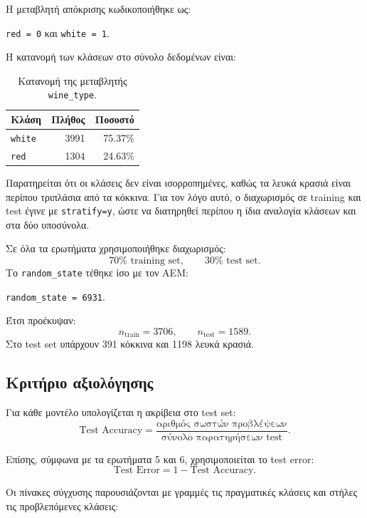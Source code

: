 \documentclass[12pt,a4paper]{article}
\newcommand{\code}[1]{\texttt{\textenglish{#1}}}
\begin{document}
Η μεταβλητή απόκρισης κωδικοποιήθηκε ως:
\begin{center}
    \code{red = 0} \hspace{1cm} και \hspace{1cm} \code{white = 1}.
\end{center}

Η κατανομή των κλάσεων στο σύνολο δεδομένων είναι:

\begin{table}[H]
\centering
\caption{Κατανομή της μεταβλητής \code{wine\_type}.}
\begin{tabular}{lrr}
\toprule
\textbf{Κλάση} & \textbf{Πλήθος} & \textbf{Ποσοστό} \\
\midrule
\code{white} & 3991 & 75.37\% \\
\code{red}   & 1304 & 24.63\% \\
\bottomrule
\end{tabular}
\end{table}

Παρατηρείται ότι οι κλάσεις δεν είναι ισορροπημένες, καθώς τα λευκά κρασιά
είναι περίπου τριπλάσια από τα κόκκινα. Για τον λόγο αυτό, ο διαχωρισμός σε
training και test έγινε με \code{stratify=y}, ώστε να διατηρηθεί περίπου η ίδια
αναλογία κλάσεων και στα δύο υποσύνολα.

Σε όλα τα ερωτήματα χρησιμοποιήθηκε διαχωρισμός:
\[
    70\% \text{ training set}, \qquad 30\% \text{ test set}.
\]
Το \code{random\_state} τέθηκε ίσο με τον ΑΕΜ:
\begin{center}
    \code{random\_state = 6931}.
\end{center}

Έτσι προέκυψαν:
\[
    n_{\text{train}}=3706, \qquad n_{\text{test}}=1589.
\]
Στο test set υπάρχουν 391 κόκκινα και 1198 λευκά κρασιά.

\subsection{Κριτήριο αξιολόγησης}

Για κάθε μοντέλο υπολογίζεται η ακρίβεια στο test set:
\[
    \text{Test Accuracy} =
    \frac{\text{αριθμός σωστών προβλέψεων}}{\text{σύνολο παρατηρήσεων test}}.
\]

Επίσης, σύμφωνα με τα ερωτήματα 5 και 6, χρησιμοποιείται το test error:
\[
    \text{Test Error} = 1 - \text{Test Accuracy}.
\]

Οι πίνακες σύγχυσης παρουσιάζονται με γραμμές τις πραγματικές κλάσεις και
στήλες τις προβλεπόμενες κλάσεις:
\end{document}
